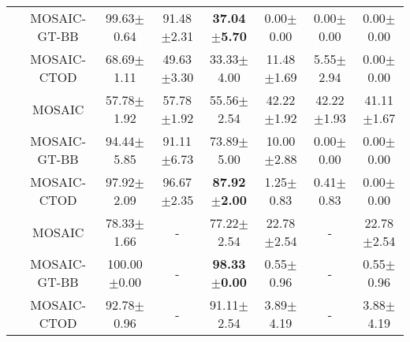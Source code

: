 \begin{table}
{\begin{tabular}{|c|c|c|c|c|c|c|c|}
  \cline{2-8}
   & MOSAIC-GT-BB & 99.63$\pm$0.64 & 91.48$\pm$2.31 & \textbf{37.04$\pm$5.70} & 0.00$\pm$0.00 & 0.00$\pm$0.00 & 0.00$\pm$0.00 \\ 
  \cline{2-8}
   & MOSAIC-CTOD & 68.69$\pm$1.11 & 49.63$\pm$3.30 & 33.33$\pm$4.00 & 11.48$\pm$1.69 & 5.55$\pm$2.94 & 0.00$\pm$0.00 \\ 
  \hhline{|========|}
  \multirow{3}{*}{Stack-Block} & MOSAIC & 57.78$\pm$1.92 & 57.78$\pm$1.92 & 55.56$\pm$2.54 & 42.22$\pm$1.92 & 42.22$\pm$1.93 & 41.11$\pm$1.67 \\ 
  \cline{2-8}
   & MOSAIC-GT-BB & 94.44$\pm$5.85 & 91.11$\pm$6.73 & 73.89$\pm$5.00 & 10.00$\pm$2.88 & 0.00$\pm$0.00 & 0.00$\pm$0.00 \\ 
  \cline{2-8}
   & MOSAIC-CTOD & 97.92$\pm$2.09 & 96.67$\pm$2.35 & \textbf{87.92$\pm$2.00} & 1.25$\pm$0.83 & 0.41$\pm$0.83 & 0.00$\pm$0.00 \\ 
  \hhline{|========|}
  \multirow{3}{*}{Press-Button} & MOSAIC & 78.33$\pm$1.66 & - & 77.22$\pm$2.54 & 22.78$\pm$2.54 & - & 22.78$\pm$2.54 \\ 
  \cline{2-8}
   & MOSAIC-GT-BB & 100.00$\pm$0.00 & - & \textbf{98.33$\pm$0.00} & 0.55$\pm$0.96 & - & 0.55$\pm$0.96 \\ 
  \cline{2-8}
   & MOSAIC-CTOD & 92.78$\pm$0.96 & - & 91.11$\pm$2.54 & 3.89$\pm$4.19 & - & 3.88$\pm$4.19 \\
  \hline
  \end{tabular}
  }
  \end{table}
